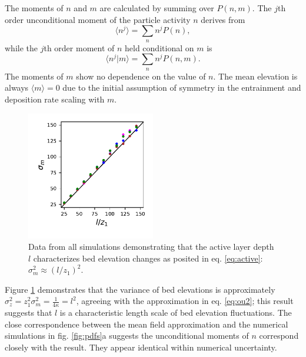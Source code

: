 The moments of $n$ and $m$ are calculated by summing over $P(n,m)$. 
The $j$th order unconditional moment of the particle activity $n$ derives from
\begin{equation} \langle n^j \rangle = \sum_{n}n^jP(n),\end{equation}
while the $j$th order moment of $n$ held conditional on $m$ is
\begin{equation} \langle n^j|m \rangle = \sum_{n}n^j P(n,m) .\end{equation}
The moments of $m$ show no dependence on the value of $n$. 
The mean elevation is always $\langle m \rangle = 0 $ due to the initial assumption of symmetry in the entrainment and deposition rate scaling with $m$. 
\begin{figure}
	\centering
	\includegraphics[width=0.5\textwidth,keepaspectratio]{./figures/ch3/variance.pdf}
	\caption{Data from all simulations demonstrating that the active layer depth $l$ characterizes bed elevation changes as posited in eq. \ref{eq:active}: $\sigma_m^2 \approx (l/z_1)^2$. }
	\label{fig:var}
\end{figure}
Figure \ref{fig:var} demonstrates that the variance of bed elevations is approximately $\sigma_z^2 = z_1^2 \sigma_m^2 = \frac{1}{4\kappa}=l^2$, agreeing with the approximation in eq. \ref{eq:ou2}; this result suggests that $l$ is a characteristic length scale of bed elevation fluctuations.
The close correspondence between the mean field approximation and the numerical simulations in fig. \ref{fig:pdfs}a suggests the unconditional moments of $n$ correspond closely with the \citet{Ancey2008} result. They appear identical within numerical uncertainty.

